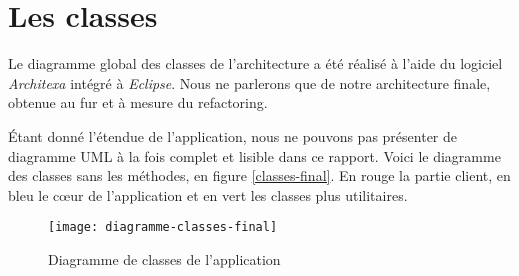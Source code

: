 \section{Les classes}

Le diagramme global des classes de l'architecture a été réalisé à l'aide du logiciel \emph{Architexa} intégré à \emph{Eclipse}. Nous ne parlerons que de notre architecture finale, obtenue au fur et à mesure du refactoring.

Étant donné l'étendue de l'application, nous ne pouvons pas présenter de diagramme UML à la fois complet et lisible dans ce rapport. Voici le diagramme des classes sans les méthodes, en figure \vref{classes-final}. En rouge la partie client, en bleu le cœur de l'application et en vert les classes plus utilitaires.

\begin{figure}[h]
\begin{center}
    \texttt{[image: diagramme-classes-final]}
\end{center}
    \caption{Diagramme de classes de l'application}
    \label{classes-final}
\end{figure}